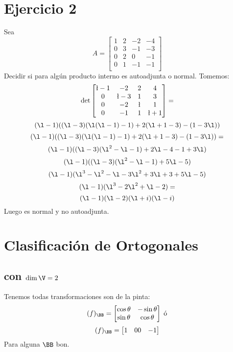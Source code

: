 \documentclass{article}
\begin{document}
\section*{Ejercicio 2}
Sea
\[
    A =
    \begin{bmatrix}
        1 & 2 & -2 & -4 \\
        0 & 3 & -1 & -3 \\
        0 & 2 & 0 & -1 \\
        0 & 1 & -1 & -1 \\
    \end{bmatrix}
\]
Decidir si para algún producto interno es autoadjunta o normal.
Tomemos:
\[
    \det
    \begin{bmatrix}
        \l-1 & -2 & 2 & 4 \\
        0 & \l-3 & 1 & 3 \\
        0 & -2 & \l & 1 \\
        0 & -1 & 1 & \l+1 \\
    \end{bmatrix} =\]
\[
    (\l - 1)((\l - 3)(\l(\l-1) - 1) + 2(\l+1-3) -(1 - 3\l))
\]
\[
    (\l - 1)((\l - 3)(\l(\l-1) - 1) + 2(\l+1-3) -(1 - 3\l)) =
\]
\[
    (\l - 1)((\l - 3)(\l^2-\l - 1) + 2\l-4 -1 + 3\l)
\]
\[
    (\l - 1)((\l - 3)(\l^2-\l - 1) + 5\l -5)
\]
\[
    (\l - 1)(\l^3-\l^2 - \l -3\l^2+3\l + 3 + 5\l -5)
\]
\[
    (\l - 1)(\l^3-2\l^2 + \l -2) =
\]
\[
    (\l - 1)(\l - 2)(\l + i)(\l - i)
\]
Luego es normal y no autoadjunta.
\section*{Clasificación de Ortogonales}
\subsection*{con $\dim \V = 2$}
Tenemos todas transformaciones son de la pinta:
\[(f)_\BB =
    \begin{bmatrix}
        \cos \theta & -\sin \theta \\
        \sin \theta & \cos \theta \\
    \end{bmatrix} \; \text{ó}
\]
\[(f)_\BB =
    \begin{bmatrix}
        1 & 0
        0 & -1
    \end{bmatrix}
\]
Para alguna $\BB$ bon.
\end{document}
